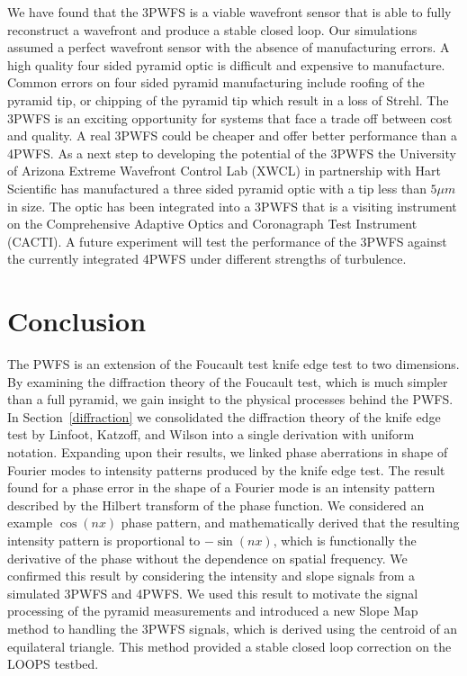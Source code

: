  We have found that the 3PWFS is a viable wavefront sensor that is able to fully reconstruct a wavefront and produce a stable closed loop. Our simulations assumed a perfect wavefront sensor with the absence of manufacturing errors. A high quality four sided pyramid optic is difficult and expensive to manufacture. Common errors on four sided pyramid manufacturing include roofing of the pyramid tip, or chipping of the pyramid tip which result in a loss of Strehl.  The 3PWFS is an exciting opportunity for systems that face a trade off between cost and quality. A real 3PWFS could be cheaper and offer better performance than a 4PWFS. As a next step to developing the potential of the 3PWFS the University of Arizona Extreme Wavefront Control Lab (XWCL) in partnership with Hart Scientific has manufactured a three sided pyramid optic with a tip less than $5\mu m$ in size. The optic has been integrated into a 3PWFS that is a visiting instrument on the Comprehensive Adaptive Optics and Coronagraph Test Instrument (CACTI). A future experiment will test the performance of the 3PWFS against the currently integrated 4PWFS under different strengths of turbulence. 
 

 

\section{Conclusion}


The PWFS is an extension of the Foucault test knife edge test to two dimensions. By examining the diffraction theory of the Foucault test, which is much simpler than a full pyramid, we gain insight to the physical processes behind the PWFS. In Section~\ref{diffraction} we consolidated the diffraction theory of the knife edge test by Linfoot\cite{linfoot1948theory}, Katzoff\cite{katzoff1971quantitative}, and Wilson\cite{wilson1975wavefront} into a single derivation with uniform notation. Expanding upon their results, we linked phase aberrations in shape of Fourier modes to intensity patterns produced by the knife edge test. The result found for a phase error in the shape of a Fourier mode is an intensity pattern described by the Hilbert transform of the phase function. We considered an example $\cos(nx)$ phase pattern, and mathematically derived that the resulting intensity pattern is proportional to $-\sin(nx)$, which is functionally the derivative of the phase without the dependence on spatial frequency. We confirmed this result by considering the intensity and slope signals from a simulated 3PWFS and 4PWFS. We used this result to motivate the signal processing of the pyramid measurements and introduced a new Slope Map method to handling the 3PWFS signals, which is derived using the centroid of an equilateral triangle. This method provided a stable closed loop correction on the LOOPS testbed.

